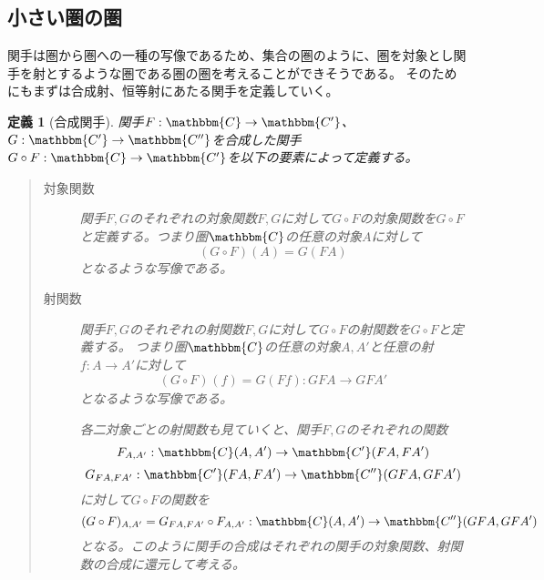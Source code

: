 \documentclass[uplatex,dvipdfmx]{jsarticle}
\newcommand{\cat}[1]{\mathbbm{#1}}
\newcommand{\arrow}{\rightarrow}
\newcommand{\functor}[3]{#1:\cat{#2}\arrow \cat{#3}}
\newcommand{\mor}[3]{#1:#2\arrow #3}
\newcommand{\arset}[3]{\cat{#1}(#2,#3)}
\newtheorem{define}{定義}[section]
\numberwithin{proof}{subsection}
\numberwithin{prop}{subsection}
\numberwithin{define}{subsection}
\begin{document}
	\subsection{小さい圏の圏}
	関手は圏から圏への一種の写像であるため、集合の圏のように、圏を対象とし関手を射とするような圏である圏の圏を考えることができそうである。
	そのためにもまずは合成射、恒等射にあたる関手を定義していく。
	\begin{define}[合成関手]
		関手$\functor{F}{C}{C'}$、$\functor{G}{C'}{C''}$を合成した関手$\functor{G\circ F}{C}{C'}$を以下の要素によって定義する。
		\begin{quote}
			\begin{description}
			\item[対象関数]関手$F,G$のそれぞれの対象関数$F,G$に対して$G\circ F$の対象関数を$G\circ F$と定義する。つまり圏$\cat{C}$の任意の対象$A$に対して\[(G\circ F)(A)=G(FA)\]となるような写像である。
			\item[射関数]関手$F,G$のそれぞれの射関数$F,G$に対して$G\circ F$の射関数を$G\circ F$と定義する。
			つまり圏$\cat{C}$の任意の対象$A,A'$と任意の射$\mor{f}{A}{A'}$に対して\[\mor{(G\circ F)_{}(f)=G(Ff)}{GFA}{GF{A'}}\]となるような写像である。

			各二対象ごとの射関数も見ていくと、関手$F,G$のそれぞれの関数\[\mor{F_{A,A'}}{\arset{C}{A}{A'}}{\arset{C'}{FA}{FA'}}\]\[\mor{G_{FA,FA'}}{\arset{C'}{FA}{FA'}}{\arset{C''}{GFA}{GFA'}}\]に対して$G\circ F$の関数を\[(G\circ F)_{A,A'}=\mor{G_{FA,FA'}\circ F_{A,A'}}{\arset{C}{A}{A'}}{\arset{C''}{GFA}{GFA'}}\]となる。このように関手の合成はそれぞれの関手の対象関数、射関数の合成に還元して考える。

			\begin{center}
\end{center}
\end{description}
\end{quote}
\end{define}
\end{document}
